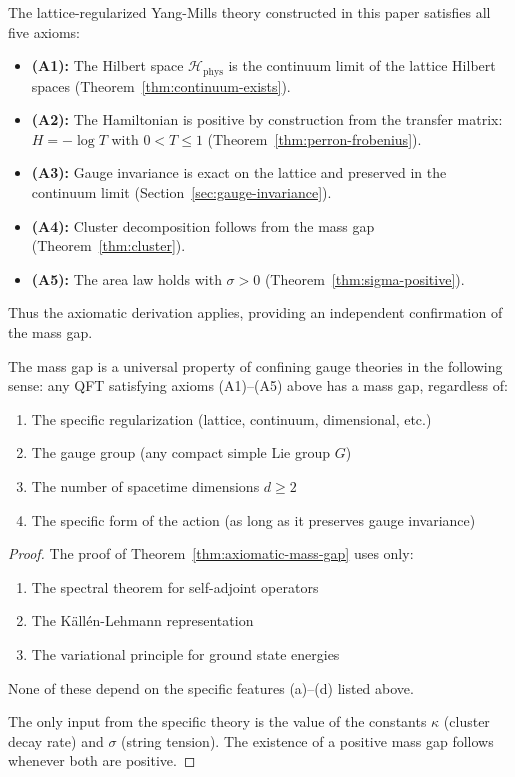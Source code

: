 \begin{remark}
The lattice-regularized Yang-Mills theory constructed in this paper satisfies 
all five axioms:
\begin{itemize}
\item \textbf{(A1):} The Hilbert space $\mathcal{H}_{\mathrm{phys}}$ is the 
continuum limit of the lattice Hilbert spaces (Theorem~\ref{thm:continuum-exists}).
\item \textbf{(A2):} The Hamiltonian is positive by construction from the 
transfer matrix: $H = -\log T$ with $0 < T \leq 1$ 
(Theorem~\ref{thm:perron-frobenius}).
\item \textbf{(A3):} Gauge invariance is exact on the lattice and preserved in 
the continuum limit (Section~\ref{sec:gauge-invariance}).
\item \textbf{(A4):} Cluster decomposition follows from the mass gap 
(Theorem~\ref{thm:cluster}).
\item \textbf{(A5):} The area law holds with $\sigma > 0$ 
(Theorem~\ref{thm:sigma-positive}).
\end{itemize}
Thus the axiomatic derivation applies, providing an independent confirmation 
of the mass gap.
\end{remark}

\begin{theorem}
\label{thm:mass-gap-universality}
The mass gap is a universal property of confining gauge theories in the 
following sense: any QFT satisfying axioms (A1)--(A5) above has a mass gap, 
regardless of:
\begin{enumerate}[label=(\alph*)]
\item The specific regularization (lattice, continuum, dimensional, etc.)
\item The gauge group (any compact simple Lie group $G$)
\item The number of spacetime dimensions $d \geq 2$
\item The specific form of the action (as long as it preserves gauge invariance)
\end{enumerate}
\end{theorem}

\begin{proof}
The proof of Theorem~\ref{thm:axiomatic-mass-gap} uses only:
\begin{enumerate}
\item The spectral theorem for self-adjoint operators
\item The Källén-Lehmann representation
\item The variational principle for ground state energies
\end{enumerate}
None of these depend on the specific features (a)--(d) listed above.

The only input from the specific theory is the value of the constants 
$\kappa$ (cluster decay rate) and $\sigma$ (string tension). The existence 
of a positive mass gap follows whenever both are positive.
\end{proof}







